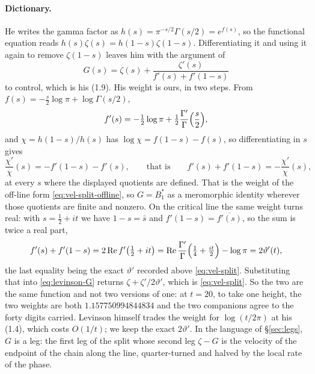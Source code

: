 \documentclass[11pt]{article}
\theoremstyle{definition}
\begin{document}
\paragraph{Dictionary.} He writes the gamma factor as
$h(s)=\pi^{-s/2}\Gamma(s/2)=e^{f(s)}$, so the functional equation reads
$h(s)\zeta(s)=h(1-s)\zeta(1-s)$. Differentiating it and using it again to
remove $\zeta(1-s)$ leaves him with the argument of
\begin{equation}\label{eq:levinson-G}
G(s)=\zeta(s)+\frac{\zeta'(s)}{f'(s)+f'(1-s)}
\end{equation}
to control, which is his (1.9). His weight is ours, in two steps. From
$f(s)=-\tfrac{s}{2}\log\pi+\log\Gamma(s/2)$,
\[
f'(s)=-\tfrac12\log\pi
+\tfrac12\frac{\Gamma'}{\Gamma}\Bigl(\frac{s}{2}\Bigr),
\]
and $\chi=h(1-s)/h(s)$ has $\log\chi=f(1-s)-f(s)$, so differentiating in $s$
gives
\begin{equation}\label{eq:levinson-weight}
\frac{\chi'}{\chi}(s)=-f'(1-s)-f'(s),
\qquad\text{that is}\qquad
f'(s)+f'(1-s)=-\frac{\chi'}{\chi}(s),
\end{equation}
at every $s$ where the displayed quotients are defined. That is the weight of the off-line form
\eqref{eq:vel-split-offline}, so $G=B_1^{\ast}$ as a meromorphic identity
wherever those quotients are finite and nonzero. On the
critical line the same weight turns real: with $s=\tfrac12+it$ we have
$1-s=\bar{s}$ and $f'(1-s)=\overline{f'(s)}$, so the sum is twice a real part,
\[
f'(s)+f'(1-s)=2\operatorname{Re}f'\bigl(\tfrac12+it\bigr)
=\operatorname{Re}\frac{\Gamma'}{\Gamma}
\Bigl(\tfrac14+\tfrac{it}{2}\Bigr)-\log\pi
=2\vartheta'(t),
\]
the last equality being the exact $\vartheta'$ recorded above
\eqref{eq:vel-split}. Substituting that into \eqref{eq:levinson-G} returns
$\zeta+\zeta'/2\vartheta'$, which is \eqref{eq:vel-split}. So the two are the
same function and not two versions of one: at $t=20$, to take one height, the
two weights are both $1.157750994844834$ and the two companions agree to the
forty digits carried. Levinson himself trades
the weight for $\log(t/2\pi)$ at his (1.4), which costs $O(1/t)$; we keep the
exact $2\vartheta'$. In the language of \S\ref{sec:legs}, $G$ is a leg: the
first leg of the split whose second leg $\zeta-G$ is the velocity of the
endpoint of the chain along the line, quarter-turned and halved by the local
rate of the phase.
\end{document}

